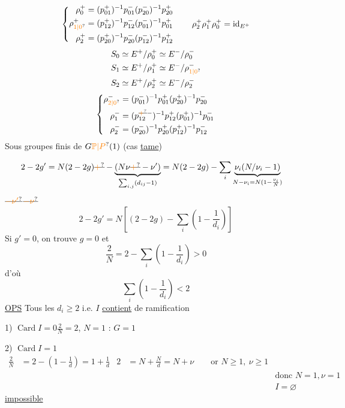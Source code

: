 \[
\left\{\begin{aligned}
\rho_0^+&=(p_{01}^+)^{-1}p_{01}^-(p_{20}^-)^{-1}p_{20}^+\\
\rho_{\unsure{1|0}}^+&=(p_{12}^+)^{-1}p_{12}^-(p_{01}^-)^{-1}p_{01}^+\\
\rho_2^+&=(p_{20}^+)^{-1}p_{20}^-(p_{12}^-)^{-1}p_{12}^+
\end{aligned}\right.
\qquad \rho_2^+\rho_1^+\rho_0^+=\mathrm{id}_{E^+}
\]
\[
\begin{aligned}
S_0&\simeq E^+/\rho_0^+\simeq E^-/\rho_0^-\\
S_1&\simeq E^+/\rho_1^+\simeq E^-/\rho_{\unsure{1|0}}^-\\
S_2&\simeq E^{+}/\rho_{2}^+\simeq E^-/\rho_2^-
\end{aligned}
\]
\[
\left\{\begin{aligned}
\rho_{\unsure{2|0}}^-&=(p_{01}^-)^{-1}p_{01}^+(p_{20}^+)^{-1}p_{20}^-\\
\rho_1^-&=(p_{12}^{\deleted{\unsure{+}}-})^{-1}p_{12}^+(p_{01}^+)^{-1}p_{01}^-\\
\rho_2^-&=(p_{20}^-)^{-1}p_{20}^+(p_{12}^+)^{-1}p_{12}^-
\end{aligned}\right.
\]
Sous groupes finis de $G\unsure{\mathbb P|P}(1)$ (cas \uline{tame})

\[
\begin{aligned}
2-2g'&=N(2-2g)\deleted{\unsure{+}}-\underbrace{(N\nu\deleted{\unsure{+}}-\nu')}_{\sum_{i,j}(d_{ij}-1)}=N(2-2g)-\sum_i\underbrace{\nu_i(N/\nu_i-1)}_{N-\nu_i=N(1-\frac{\nu_i}{N})}
\end{aligned}
\]
$\deleted{\unsure{-\nu'}}$\qquad $\deleted{\unsure{-\nu}}$
\[
\boxed{2-2g'=N\left[(2-2g)-\sum_i\left(1-\frac1{d_i}\right)\right]}
\]
Si $g'=0$, on trouve $g=0$ et
\[
\boxed{\frac2N=2-\sum_i\left(1-\frac1{d_i}\right)>0}
\]
d'où
\[
\sum_i\left(1-\frac1{d_i}\right)<2
\]
\uline{OPS} Tous les $d_i\geq2$  i.e. $I$ \uline{contient}  de ramification

1) $\operatorname{Card} I=0$\qquad $\frac2N=2$, $N=1$ :  $G=1$

2) $\operatorname{Card} I=1$
\[
\begin{aligned}
\frac2N&=2-\left(1-\frac1d\right)=1+\frac1d
&2&=N+\frac Nd=N+\nu\qquad\text{or }N\geq1,\ \nu\geq1\\
&&&&\text{donc }N=1,\nu=1\\
&&&& I=\varnothing
\end{aligned}
\]
\uline{impossible}

